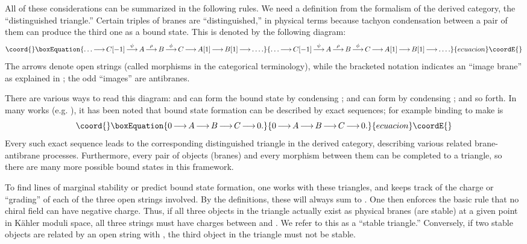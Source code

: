 \documentclass[a4paper,12pt]{amsart}
\numberwithin{equation}{section}
\theoremstyle{plain}
\theoremstyle{definition}
\def\mapr{\mathop{\longrightarrow}\limits}
\begin{document}
All of these considerations can be summarized in the following rules.
We need a definition from the formalism of the derived category, the
``distinguished triangle.''  Certain triples of branes are ``distinguished,''
in physical terms because tachyon condensation between a pair of them can
produce the third one as a bound state.  This is denoted by the following
diagram:
\begin{equation}\coord{}\boxEquation{ \label{eq:disttri}
\ldots\mapr C[-1]\mapr^\psi A\mapr^\rho B\mapr^\phi C
\mapr A[1] \mapr B[1] \mapr \ldots .
}{ \ldots\mapr C[-1]\mapr^\psi A\mapr^\rho B\mapr^\phi C
\mapr A[1] \mapr B[1] \mapr \ldots .
}{ecuacion}\coordE{}\end{equation}
The arrows denote open strings (called morphisms in the categorical
terminology), while the bracketed notation \coordHE{} indicates an ``image
brane'' as explained in \cite{DCS}; the odd ``images'' are antibranes.

There are various ways to read this diagram: \coordHE{} and \coordHE{} can form the
bound state \coordHE{} by condensing \myHighlight{$\psi$}\coordHE{}; \coordHE{} and \coordHE{} can form \coordHE{} by
condensing \myHighlight{$\rho$}\coordHE{}; and so forth.
In many works (e.g. \cite{HarveyMoore}), it has been noted that bound
state formation can be described by exact sequences; for example \coordHE{} binding to make \coordHE{} is
\begin{equation}\coord{}\boxEquation{
0 \mapr A\mapr B\mapr C \mapr 0 .
}{
0 \mapr A\mapr B\mapr C \mapr 0 .
}{ecuacion}\coordE{}\end{equation}
Every such exact sequence leads to the corresponding distinguished
triangle in the derived category, describing various related
brane-antibrane processes.  Furthermore, every pair of objects
(branes) and every morphism between them can be completed to a
triangle, so there are many more possible bound states in this
framework.

To find lines of marginal stability or predict bound state formation,
one works with these triangles, and keeps track of the \coordHE{} charge
or ``grading'' of each of the three open strings involved.  By the
definitions, these will always sum to \coordHE{}.  One then enforces the
basic rule that no chiral field can have negative \coordHE{} charge.
Thus, if all three objects in the triangle actually exist as physical
branes (are stable) at a given point in K\"ahler moduli space, all
three strings must have \coordHE{} charges between \coordHE{} and \coordHE{}.  We refer
to this as a ``stable triangle.''  Conversely, if two stable objects
are related by an open string with \coordHE{}, the third object in the
triangle must not be stable.
\end{document}
